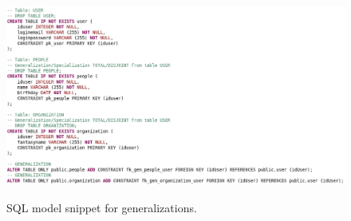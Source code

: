 \begin{figure}[!htb]
    \centering
    \caption{SQL model snippet for generalizations.}
    \includegraphics[width=\textwidth]{img/SQL_Generalization.png}
    \label{fig:SQL_Generalization}
\end{figure}

